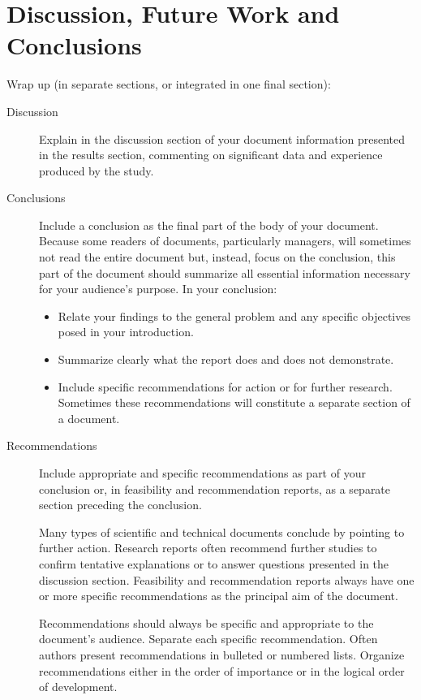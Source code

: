 \cleardoublepage
\chapter{Discussion, Future Work and Conclusions}
\label{dc} Wrap up (in separate sections, or integrated in one final
section):

\begin{description}
  \item[Discussion] Explain in the discussion section of your document information
presented in the results section, commenting on significant data and
experience produced by the study.
  \item[Conclusions] Include a conclusion as the final part of the body of your document.
    Because some readers of documents, particularly managers,
    will sometimes not read the entire document but, instead, focus on the conclusion,
    this part of the document should summarize all essential information necessary for your audience's purpose.
    In your conclusion:
    \begin{itemize}
      \item Relate your findings to the general problem and any specific objectives posed in your introduction.
      \item Summarize clearly what the report does and does not demonstrate.

      \item Include specific recommendations for action or for further research.
      Sometimes these recommendations will constitute a separate section of a document.

    \end{itemize}
  \item[Recommendations] Include appropriate and specific recommendations as part of your conclusion or,
  in feasibility and recommendation reports, as a separate section preceding the conclusion.

Many types of scientific and technical documents conclude by
pointing to further action. Research reports often recommend further
studies to confirm tentative explanations or to answer questions
presented in the discussion section. Feasibility and recommendation
reports always have one or more specific recommendations as the
principal aim of the document.

Recommendations should always be specific and appropriate to the
document's audience. Separate each specific recommendation. Often
authors present recommendations in bulleted or numbered lists.
Organize recommendations either in the order of importance or in the
logical order of development.
\end{description}
